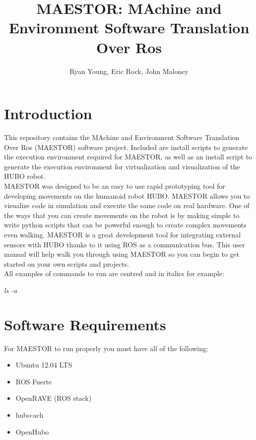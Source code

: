 \documentclass[12pt]{article}
\author{Ryan Young, Eric Rock, John Maloney}
\date{}
\begin{document}
\title{\vspace{50mm} MAESTOR: MAchine and Environment Software Translation Over Ros}
\maketitle
\pagebreak



\tableofcontents
\pagebreak
\section{Introduction}

This repository contains the MAchine and Environment Software Translation Over Ros (MAESTOR) software project. Included are install scripts to generate the execution environment required for MAESTOR, as well as an install script to generate the execution environment for virtualization and visualization of the HUBO robot.\\

MAESTOR was designed to be an easy to use rapid prototyping tool for developing movements on the humanoid robot HUBO. MAESTOR allows you to visualize code in simulation and execute the same code on real hardware. One of the ways that you can create movements on the robot is by making simple to write python scripts that can be powerful enough to create complex movements even walking. MAESTOR is a great development tool for integrating external sensors with HUBO thanks to it using ROS as a communication bus. This user manual will help walk you through using MAESTOR so you can begin to get started on your own scripts and projects.\\ 

\noindent
All examples of commands to run are centred and in italics for example:
\begin{center}
\textit{ls -a}
\end{center}

\section{Software Requirements}
For MAESTOR to run properly you must have all of the following:
\begin{itemize}
	\item Ubuntu 12.04 LTS
	\item ROS Fuerte
	\item OpenRAVE (ROS stack)
	\item hubo-ach
	\item OpenHubo
\end{itemize}
\end{document}
